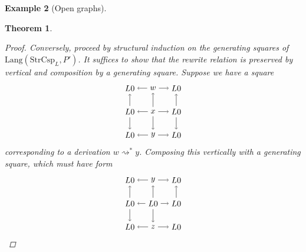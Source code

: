\documentclass{amsart}
\newcommand{\StrCsp}{\cat{StrCsp}}
\newcommand{\Lang}{\mathrm{Lang}}
\newcommand{\cat}[1]{\mathrm{#1}}
\newcommand{\deriv}[2]{#1 \rightsquigarrow^\ast #2}
\newtheorem{theorem}{Theorem}[section]
\theoremstyle{remark}
\theoremstyle{definition}
\newtheorem{example}[theorem]{Example}
\begin{document}
\begin{example}[Open graphs]
{{\begin{theorem}
\begin{proof}
  Conversely, proceed by structural induction on the generating
  squares of $ \Lang ( \StrCsp_L , P' ) $.  It suffices to show that
  the rewrite relation is preserved by vertical and composition by a
  generating square.  Suppose we have a square
  \[
    \begin{tikzpicture}
      \node (1t) at (0,2) {$ L 0 $};
      \node (2t) at (1,2) {$ w $};
      \node (3t) at (2,2) {$ L 0 $};
      \node (1m) at (0,1) {$ L 0 $};
      \node (2m) at (1,1) {$ x $};
      \node (3m) at (2,1) {$ L 0 $};
      \node (1b) at (0,0) {$ L 0 $};
      \node (2b) at (1,0) {$ y $};
      \node (3b) at (2,0) {$ L 0 $};
      \draw [->] (2t) to node [] {\scriptsize{$  $}} (1t);
      \draw [->] (2t) to node [] {\scriptsize{$  $}} (3t);
      \draw [->] (2m) to node [] {\scriptsize{$  $}} (1m);
      \draw [->] (2m) to node [] {\scriptsize{$  $}} (3m);
      \draw [->] (2b) to node [] {\scriptsize{$  $}} (1b);
      \draw [->] (2b) to node [] {\scriptsize{$  $}} (3b);
      \draw [->] (1m) to node [] {\scriptsize{$  $}} (1t);
      \draw [->] (2m) to node [] {\scriptsize{$  $}} (2t);
      \draw [->] (3m) to node [] {\scriptsize{$  $}} (3t);
      \draw [->] (1m) to node [] {\scriptsize{$  $}} (1b);
      \draw [->] (2m) to node [] {\scriptsize{$  $}} (2b);
      \draw [->] (3m) to node [] {\scriptsize{$  $}} (3b);
    \end{tikzpicture}
  \]
  corresponding to a derivation $ \deriv{w}{y} $. Composing this
  vertically with a generating square, which must have form
  \[
    \begin{tikzpicture}
      \node (1t) at (0,2) {$ L 0 $};
      \node (2t) at (1,2) {$ y $};
      \node (3t) at (2,2) {$ L 0 $};
      \node (1m) at (0,1) {$ L 0 $};
      \node (2m) at (1,1) {$ L 0 $};
      \node (3m) at (2,1) {$ L 0 $};
      \node (1b) at (0,0) {$ L 0 $};
      \node (2b) at (1,0) {$ z $};
      \node (3b) at (2,0) {$ L 0 $};
      \draw [->] (2t) to node [] {\scriptsize{$  $}} (1t);
      \draw [->] (2t) to node [] {\scriptsize{$  $}} (3t);
      \draw [->] (2m) to node [] {\scriptsize{$  $}} (1m);
      \draw [->] (2m) to node [] {\scriptsize{$  $}} (3m);
      \draw [->] (2b) to node [] {\scriptsize{$  $}} (1b);
      \draw [->] (2b) to node [] {\scriptsize{$  $}} (3b);
      \draw [->] (1m) to node [] {\scriptsize{$  $}} (1t);
      \draw [->] (2m) to node [] {\scriptsize{$  $}} (2t);
      \draw [->] (3m) to node [] {\scriptsize{$  $}} (3t);
      \draw [->] (1m) to node [] {\scriptsize{$  $}} (1b);
      \draw [->] (2m) to node [] {\scriptsize{$  $}} (2b);

\end{tikzpicture}\]
\end{proof}
\end{theorem}}}
\end{example}
\end{document}
